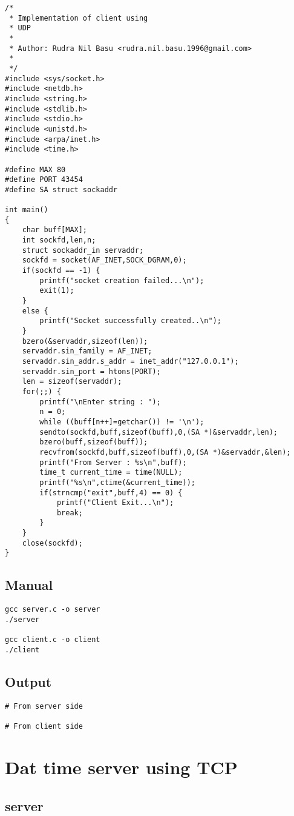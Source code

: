 \documentclass[12pt]{article}
\begin{document}
\begin{lstlisting}
/*
 * Implementation of client using
 * UDP
 * 
 * Author: Rudra Nil Basu <rudra.nil.basu.1996@gmail.com>
 * 
 */
#include <sys/socket.h>
#include <netdb.h>
#include <string.h>
#include <stdlib.h>
#include <stdio.h>
#include <unistd.h>
#include <arpa/inet.h>
#include <time.h>

#define MAX 80
#define PORT 43454
#define SA struct sockaddr

int main()
{
	char buff[MAX];
	int sockfd,len,n;
	struct sockaddr_in servaddr;
	sockfd = socket(AF_INET,SOCK_DGRAM,0);
	if(sockfd == -1) {
		printf("socket creation failed...\n");
		exit(1);
	}
	else {
		printf("Socket successfully created..\n");
	}
	bzero(&servaddr,sizeof(len));
	servaddr.sin_family = AF_INET;
	servaddr.sin_addr.s_addr = inet_addr("127.0.0.1");
	servaddr.sin_port = htons(PORT);
	len = sizeof(servaddr);
	for(;;) {
		printf("\nEnter string : ");
		n = 0;
		while ((buff[n++]=getchar()) != '\n');
		sendto(sockfd,buff,sizeof(buff),0,(SA *)&servaddr,len);
		bzero(buff,sizeof(buff));
		recvfrom(sockfd,buff,sizeof(buff),0,(SA *)&servaddr,&len);
		printf("From Server : %s\n",buff);
		time_t current_time = time(NULL);
		printf("%s\n",ctime(&current_time));
		if(strncmp("exit",buff,4) == 0) {
			printf("Client Exit...\n");
			break;
		}
	}
	close(sockfd);
}
\end{lstlisting}

\subsection{Manual}

\begin{lstlisting}
gcc server.c -o server
./server

gcc client.c -o client
./client
\end{lstlisting}

\subsection{Output}

\begin{lstlisting}
# From server side

# From client side
\end{lstlisting}

\section{Dat time server using TCP}
\subsection{server}
\end{document}
